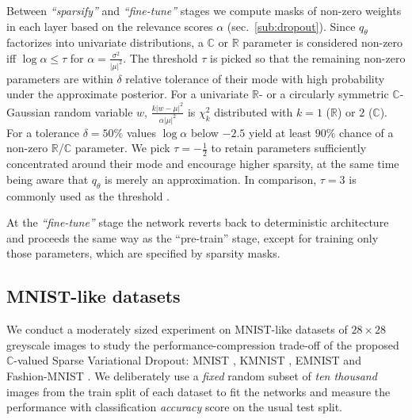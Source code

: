 \documentclass[a4paper,10pt,twocolumn]{article}
\newcommand{\real}{\mathbb{R}}
\newcommand{\cplx}{\mathbb{C}}
\begin{document}
Between \emph{``sparsify''} and \emph{``fine-tune''} stages we compute masks of non-zero
weights in each layer based on the relevance scores $\alpha$ (sec.~\ref{sub:dropout}).
Since $q_\theta$ factorizes into univariate distributions, a $\cplx$ or $\real$ parameter
is considered non-zero iff $\log \alpha \leq \tau$ for $
  \alpha = \tfrac{\sigma^2}{\lvert \mu \rvert^2}
$.
The threshold $\tau$ is picked so that the remaining non-zero parameters are within
$\delta$ relative tolerance of their mode with high probability under the approximate
posterior. For a univariate $\real$- or a circularly symmetric $\cplx$-Gaussian random
variable $w$, $
  \tfrac{k \lvert w - \mu \rvert^2}
        {\alpha \lvert \mu \rvert^2}
$ is $\chi^2_k$ distributed with $k=1$ ($\real$) or $2$ ($\cplx$).
%
For a tolerance $\delta = 50\%$ values $\log \alpha$ below $-2.5$ yield at least $90\%$
chance of a non-zero $\real$/$\cplx$ parameter. We pick $\tau = -\tfrac12$ to retain
parameters sufficiently concentrated around their mode and encourage higher sparsity,
at the same time being aware that $q_\theta$ is merely an approximation. In comparison,
$\tau = 3$ is commonly used as the threshold
\citep{molchanov_variational_2017,kingma_variational_2015}.

At the \emph{``fine-tune''} stage the network reverts back to deterministic architecture
and proceeds the same way as the ``pre-train'' stage, except for training only those
parameters, which are specified by sparsity masks.



\subsection{MNIST-like datasets} %
\label{sub:mnist_like_datasets}

We conduct a moderately sized experiment on MNIST-like datasets of $28\times 28$ greyscale
images to study the performance-compression trade-off of the proposed $\cplx$-valued Sparse
Variational Dropout: MNIST \citep{lecun_gradient-based_1998}, KMNIST \citep{clanuwat_deep_2018},
EMNIST \citep{cohen_emnist_2017} and Fashion-MNIST \citep{xiao_fashion-mnist_2017}.
%
We deliberately use a \emph{fixed} random subset of \emph{ten thousand} images from the train
split of each dataset to fit the networks and measure the performance with classification
\emph{accuracy} score on the usual test split.
\end{document}
